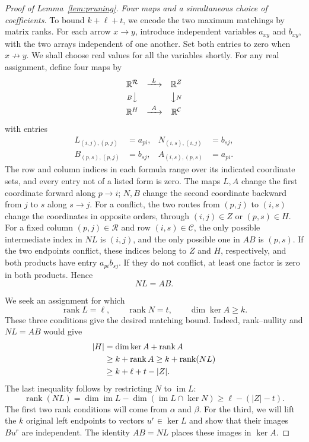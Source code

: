 \documentclass[11pt]{article}
\theoremstyle{remark}
\newcommand{\abs}[1]{\lvert #1\rvert}
\DeclareMathOperator{\rank}{rank}
\DeclareMathOperator{\im}{im}
\newcommand{\R}{\mathbb R}
\begin{document}
\begin{proof}[Proof of Lemma~\ref{lem:pruning}]
\medskip\noindent
\emph{Four maps and a simultaneous choice of coefficients.}
To bound $k+\ell+t$, we encode the two maximum matchings by matrix ranks.
For each arrow $x\to y$, introduce independent variables $a_{xy}$ and
$b_{xy}$, with the two arrays independent of one another.  Set both
entries to zero when $x\not\to y$.  We shall choose real values for all
the variables shortly.  For any real assignment, define four maps by
\[
 \begin{array}{ccc}
 \R^{\mathcal R}&\xrightarrow{\ L\ }&\R^Z\\[3pt]
 {\scriptstyle B}\big\downarrow&&\big\downarrow{\scriptstyle N}\\[3pt]
 \R^H&\xrightarrow{\ A\ }&\R^{\mathcal C}
 \end{array}
\]
with entries
\begin{equation}\label{eq:pruning-maps}
 \begin{aligned}
 L_{(i,j),(p,j)}&=a_{pi},&
 N_{(i,s),(i,j)}&=b_{sj},\\
 B_{(p,s),(p,j)}&=b_{sj},&
 A_{(i,s),(p,s)}&=a_{pi}.
 \end{aligned}
\end{equation}
The row and column indices in each formula range over its indicated
coordinate sets, and every entry not of a listed form is zero.
The maps $L,A$ change the first coordinate forward along $p\to i$;
$N,B$ change the second coordinate backward from $j$ to $s$ along $s\to j$.
For a conflict, the two routes from $(p,j)$ to $(i,s)$ change the
coordinates in opposite orders, through $(i,j)\in Z$ or $(p,s)\in H$.
For a fixed column $(p,j)\in\mathcal R$ and row
$(i,s)\in\mathcal C$, the only possible intermediate index in $NL$ is
$(i,j)$, and the only possible one in $AB$ is $(p,s)$.  If the two
endpoints conflict, these indices belong to $Z$ and $H$, respectively,
and both products have entry $a_{pi}b_{sj}$.  If they do not conflict,
at least one factor is zero in both products.  Hence
\begin{equation}\label{eq:pruning-commute}
 NL=AB.
\end{equation}

We seek an assignment for which
\[
 \rank L=\ell,\qquad \rank N=t,\qquad \dim\ker A\geq k.
\]
These three conditions give the desired matching bound. Indeed,
rank--nullity and $NL=AB$ would give
\begin{align}
 \abs H
 &=\dim\ker A+\rank A\notag\\
 &\geq k+\rank A
 \geq k+\rank(NL)\notag\\
 &\geq k+\ell+t-\abs Z.
 \label{eq:pruning-rank-bound}
\end{align}
The last inequality follows by restricting $N$ to $\im L$:
\[
 \rank(NL)
 =\dim\im L-\dim(\im L\cap\ker N)
 \geq\ell-(\abs Z-t).
\]
The first two rank conditions will come from $\alpha$ and $\beta$.
For the third, we will lift the $k$ original left endpoints to vectors
$u^r\in\ker L$ and show that their images $Bu^r$ are independent.
The identity $AB=NL$ places these images in $\ker A$.


\end{proof}
\end{document}
